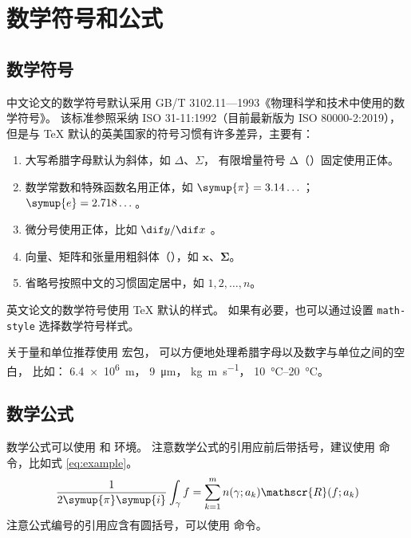 
\chapter{数学符号和公式}

\section{数学符号}

中文论文的数学符号默认采用 GB/T 3102.11—1993《物理科学和技术中使用的数学符号》。
该标准参照采纳 ISO 31-11:1992（目前最新版为 ISO 80000-2:2019），
但是与 \TeX{} 默认的英美国家的符号习惯有许多差异，主要有：
\begin{enumerate}
  \item 大写希腊字母默认为斜体，如 $\Delta$、$\Sigma$，
    有限增量符号 $\increment$（）固定使用正体。
  \item 数学常数和特殊函数名用正体，如 $\symup{\pi} = 3.14\dots$；$\symup{e} = 2.718\dots$。
  \item 微分号使用正体，比如 $ \dif y / \dif x $ 。
  \item 向量、矩阵和张量用粗斜体（），如 $\symbf{x}$、$\symbf{\Sigma}$。
  \item 省略号按照中文的习惯固定居中，如 $1, 2, \dots, n$。
\end{enumerate}

英文论文的数学符号使用 \TeX{} 默认的样式。
如果有必要，也可以通过设置 \verb|math-style| 选择数学符号样式。

关于量和单位推荐使用
\href{http://mirrors.ctan.org/macros/latex/contrib/siunitx/siunitx.pdf}{}
宏包，
可以方便地处理希腊字母以及数字与单位之间的空白，
比如：
\SI{6.4e6}{m}，
\SI{9}{\micro\meter}，
\si{kg.m.s^{-1}}，
\SIrange{10}{20}{\degreeCelsius}。



\section{数学公式}

数学公式可以使用  和  环境。
注意数学公式的引用应前后带括号，建议使用  命令，比如式 \eqref{eq:example}。
\begin{equation}
  \frac{1}{2 \symup{\pi} \symup{i}} \int_\gamma f = \sum_{k=1}^m n(\gamma; a_k) \mathscr{R}(f; a_k)
  \label{eq:example}
\end{equation}
注意公式编号的引用应含有圆括号，可以使用  命令。

